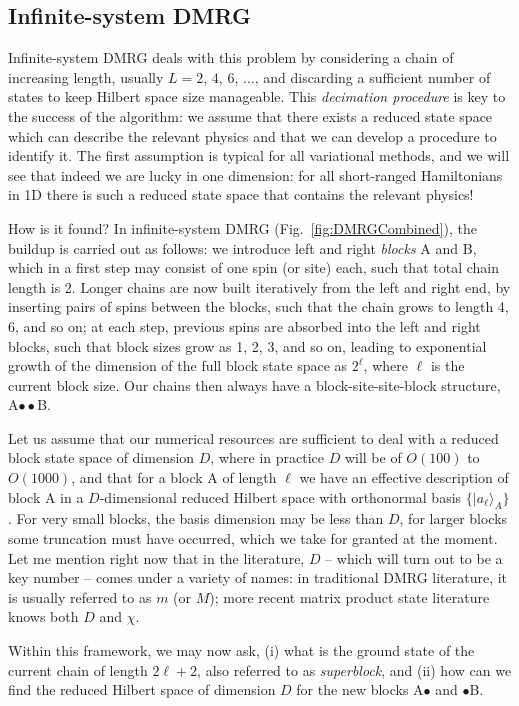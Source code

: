 \documentclass[a4paper,10pt,oneside,onecolumn,1p,times]{elsarticle}
\newcommand{\ket}[1]{\mbox{$| #1  \rangle$}}
\begin{document}
\subsection{Infinite-system DMRG}

Infinite-system DMRG deals with this problem by considering a chain of increasing length, usually $L=2$, $4$, $6$, $\ldots$, and discarding a sufficient number of states to keep Hilbert space size manageable. This {\em decimation procedure} is key to the success of the algorithm: we assume that there exists a reduced state space which can describe the relevant physics and that we can develop a procedure to identify it. The first assumption is typical for all variational methods, and we will see that indeed we are lucky in one dimension: for all short-ranged Hamiltonians in 1D there is such a reduced state space that contains the relevant physics!

How is it found? In infinite-system DMRG (Fig.~\ref{fig:DMRGCombined}), the buildup is carried out as follows: we introduce left and right {\em blocks} A and B, which in a first step may consist of one spin (or site) each, such that total chain length is 2. Longer chains are now built iteratively from the left and right end, by inserting pairs of spins between the blocks, such that the chain grows to length 4, 6, and so on; at each step, previous spins are absorbed into the left and right blocks, such that block sizes grow as 1, 2, 3, and so on, leading to exponential growth of the dimension of the full block state space as $2^\ell$, where $\ell$ is the current block size. Our chains then always have a block-site-site-block structure, A$\bullet\bullet$B.

Let us assume that our numerical resources are sufficient to deal with a reduced block state space of dimension $D$, where in practice $D$ will be of $O(100)$ to $O(1000)$, and that for a block A of length $\ell$ we have an effective description of block A in a $D$-dimensional reduced Hilbert space with orthonormal basis $\{ \ket{a_\ell}_A \}$. For very small blocks, the basis dimension may be less than $D$, for larger blocks some truncation must have occurred, which we take for granted at the moment. Let me mention right now that in the literature, $D$ -- which will turn out to be a key number -- comes under a variety of names: in traditional DMRG literature, it is usually referred to as $m$ (or $M$); more recent matrix product state literature knows both $D$ and $\chi$.

Within this framework, we may now ask, (i) what is the ground state of the current chain of length $2\ell +2$, also referred to as {\em superblock}, and (ii) how can we find the reduced Hilbert space of dimension $D$ for the new blocks A$\bullet$ and $\bullet$B. 
\end{document}
